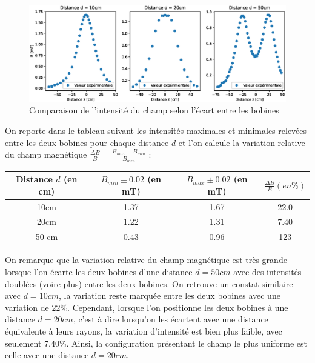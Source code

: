 \documentclass[12pt]{article}
\begin{document}
\begin{figure}[h!]
    \begin{center}
        \includegraphics[scale=0.6]{img/ChampDistance.eps}
    \end{center}
    \caption{Comparaison de l'intensité du champ selon l'écart entre les bobines}
\end{figure}

On reporte dans le tableau suivant les intensités maximales et minimales relevées entre les deux bobines pour chaque distance $d$ et l'on calcule la variation relative du champ magnétique
$\frac{\Delta B}{B} = \frac{B_{max} - B_{min}}{B_{min}}$ :

\begin{table}[h!]
    \begin{center}
        \begin{tabular}{c|c|c|c}
            Distance $d$ (en cm) & $B_{min} \pm 0.02$ (en mT) & $B_{max} \pm 0.02$ (en mT) & $\frac{\Delta B}{B} (en \%)$ \\ \hline
            10cm & 1.37 & 1.67 & 22.0 \\
            20cm & 1.22 & 1.31 & 7.40 \\
            50 cm & 0.43 & 0.96 & 123 \\
        \end{tabular}
    \end{center}
\end{table}

On remarque que la variation relative du champ magnétique est très grande lorsque l'on écarte les deux bobines d'une distance $d=50cm$ avec des intensités doublées (voire plus) entre les deux bobines. 
On retrouve un constat similaire avec $d=10cm$, la variation reste marquée entre les deux bobines avec une variation de $22\%$. Cependant, lorsque l'on positionne les deux bobines à une distance $d = 20cm$,
c'est à dire lorsqu'on les écartent avec une distance équivalente à leurs rayons, la variation d'intensité est bien plus faible, avec seulement 7.40\%. Ainsi, la configuration présentant 
le champ le plus uniforme est celle avec une distance $d=20cm$.
\end{document}
